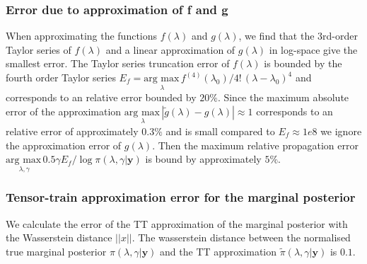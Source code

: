 \subsubsection{Error due to approximation of f and g}
\label{sec:fgErros}
When approximating the functions $f(\lambda)$ and $g(\lambda)$, we find that the 3rd-order Taylor series of $f(\lambda)$ and a linear approximation of $g(\lambda)$ in log-space give the smallest error.
The Taylor series truncation error of $f(\lambda)$ is bounded by the fourth order Taylor series $E_f = \underset{\lambda}{\text{arg max}\,} f^{(4)}(\lambda_0)/ 4! \, (\lambda - \lambda_{0} )^4$ and corresponds to an relative error bounded by $20\%$.
Since the maximum absolute error of the approximation $\underset{\lambda}{\text{arg max}\,}|\tilde{g}(\lambda) - g(\lambda) | \approx 1$ corresponds to an relative error of approximately $0.3\%$ and is small compared to $E_f \approx 1e8$ we ignore the approximation error of $g(\lambda)$.
Then the maximum relative propagation error $\underset{\lambda, \gamma}{\text{arg max}\,} 0.5 \gamma  E_f / \log{\pi{(\lambda ,\gamma | \bm{y})}} $ is bound by approximately $5\%$.
\subsubsection{Tensor-train approximation error for the marginal posterior}
We calculate the error of the TT approximation of the marginal posterior with the Wasserstein distance $||x||$.
The wasserstein distance between the normalised true marginal posterior $\pi(\lambda,\gamma|\bm{y})$ and the TT approximation $\tilde{\pi}(\lambda,\gamma|\bm{y})$ is $0.1$.


